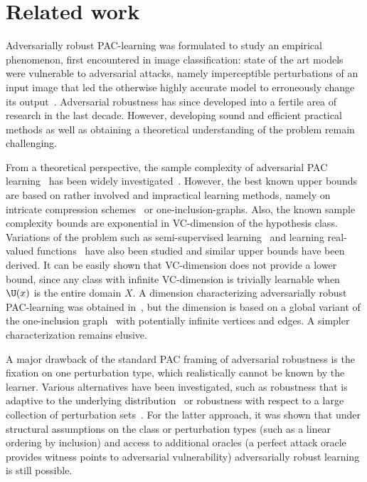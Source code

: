 \section{Related work}
Adversarially robust PAC-learning was formulated to study an empirical phenomenon, first encountered in image classification: state of the art models were vulnerable to adversarial attacks, namely imperceptible perturbations of an input image that led the otherwise highly accurate model to erroneously change its output~\citep{SzegedyZSBEGF13}. Adversarial robustness has since developed into a fertile area of research in the last decade. 
However, developing sound and efficient practical methods as well as obtaining a theoretical understanding of the problem remain challenging.

From a theoretical perspective, the sample complexity of adversarial PAC learning~\citep{feige2015learning, MontasserHS19} has been widely investigated~\citep{feige2015learning, attias2018improved, ashtiani2020black,montasser2021adversarially}. However, the best known upper bounds~\citep{MontasserHS19, montasser2022adversarially} are based on rather involved and impractical learning methods, namely on intricate compression schemes~\citep{moran2016sample} or one-inclusion-graphs.
Also, the known sample complexity bounds are exponential in VC-dimension of the hypothesis class. 
Variations of the problem such as semi-supervised learning~\citep{ashtiani2020black, attias2022characterization} and learning real-valued functions~\citep{attias2023adversarially} have also been studied and similar upper bounds have been derived. It can be easily shown that VC-dimension does not provide a lower bound, since any class with infinite VC-dimension is trivially learnable when
$\U(x)$ is the entire domain $X$. A dimension characterizing adversarially robust PAC-learning was obtained in~\citep{montasser2022adversarially}, but the dimension is based on a global variant of the one-inclusion graph~\citep{haussler1994predicting} 
with potentially infinite vertices and edges. A simpler characterization remains elusive.

A major drawback of the standard PAC framing of adversarial robustness is the fixation on one perturbation type, which realistically cannot be known by the learner. Various alternatives have been investigated, such as robustness that is adaptive to the underlying distribution~\citep{BhattacharjeeC21adaptive} or robustness with respect to a large collection of perturbation sets~\citep{montasser2021adversarially,lechner2024adversarially}. For the latter approach, it was shown that under structural assumptions on the class or perturbation types (such as a linear ordering by inclusion) and access to additional oracles (a perfect attack oracle provides witness points to adversarial vulnerability) adversarially robust learning is still possible.


